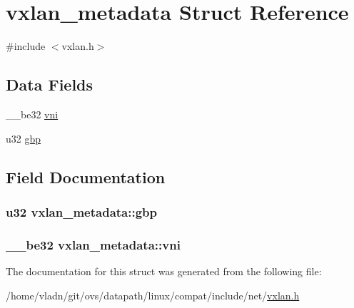 \hypertarget{structvxlan__metadata}{}\section{vxlan\+\_\+metadata Struct Reference}
\label{structvxlan__metadata}


{\ttfamily \#include $<$vxlan.\+h$>$}

\subsection*{Data Fields}
\begin{DoxyCompactItemize}
\item 
\+\_\+\+\_\+be32 \hyperlink{structvxlan__metadata_ac78e68c33d3c91061e3642616135cbc8}{vni}
\item 
u32 \hyperlink{structvxlan__metadata_ad71c7ab9d521840720e30ebae8ff2a6a}{gbp}
\end{DoxyCompactItemize}


\subsection{Field Documentation}
\hypertarget{structvxlan__metadata_ad71c7ab9d521840720e30ebae8ff2a6a}{}
\subsubsection[{gbp}]{\setlength{\rightskip}{0pt plus 5cm}u32 vxlan\+\_\+metadata\+::gbp}\label{structvxlan__metadata_ad71c7ab9d521840720e30ebae8ff2a6a}
\hypertarget{structvxlan__metadata_ac78e68c33d3c91061e3642616135cbc8}{}
\subsubsection[{vni}]{\setlength{\rightskip}{0pt plus 5cm}\+\_\+\+\_\+be32 vxlan\+\_\+metadata\+::vni}\label{structvxlan__metadata_ac78e68c33d3c91061e3642616135cbc8}


The documentation for this struct was generated from the following file\+:\begin{DoxyCompactItemize}
\item 
/home/vladn/git/ovs/datapath/linux/compat/include/net/\hyperlink{vxlan_8h}{vxlan.\+h}\end{DoxyCompactItemize}
